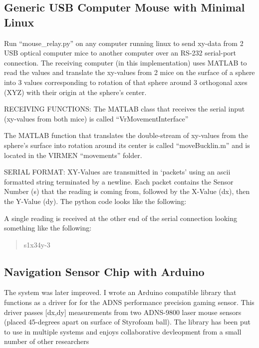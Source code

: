 \documentclass[../main.tex]{subfiles}
\begin{document}
\subsection{Generic USB Computer Mouse with Minimal Linux}\label{sec:generic-usb-computer-mouse-with-minimal-linux}

Run ``mouse\_relay.py'' on any computer running linux to send xy-data from 2 USB optical computer mice to another computer over an RS-232 serial-port connection.
The receiving computer (in this implementation) uses MATLAB to read the values and translate the xy-values from 2 mice on the surface of a sphere into 3 values corresponding to rotation of that sphere around 3 orthogonal axes (XYZ) with their origin at the sphere's center.

RECEIVING FUNCTIONS: The MATLAB class that receives the serial input (xy-values from both mice) is called ``VrMovementInterface''

The MATLAB function that translates the double-stream of xy-values from the sphere's surface into rotation around its center is called ``moveBucklin.m'' and is located in the VIRMEN ``movements'' folder.

SERIAL FORMAT: XY-Values are transmitted in `packets' using an ascii formatted string terminated by a newline.
Each packet contains the Sensor Number (s) that the reading is coming from, followed by the X-Value (dx), then the Y-Value (dy).
The python code looks like the following:

A single reading is received at the other end of the serial connection looking something like the following:

\begin{quote}
	s1x34y-3
\end{quote}

\subsection{Navigation Sensor Chip with Arduino}\label{sec:navigation-sensor-chip-with-arduino}

The system was later improved.
I wrote an Arduino compatible library that functions as a driver for for the ADNS performance precision gaming sensor.
This driver passes {[}dx,dy{]} measurements from two ADNS-9800 laser mouse sensors (placed 45-degrees apart on surface of Styrofoam ball).
The library has been put to use in multiple systems and enjoys collaborative devleopment from a small number of other researchers \cite{romano2019teensy}
\end{document}
